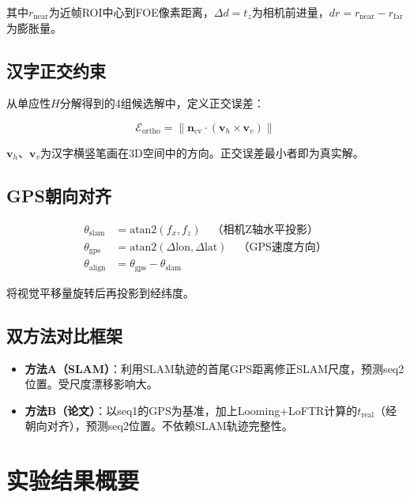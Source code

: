 \documentclass[12pt,a4paper]{ctexart}
\begin{document}
其中$r_{\text{near}}$为近帧ROI中心到FOE像素距离，$\Delta d = t_z$为相机前进量，$dr = r_{\text{near}} - r_{\text{far}}$为膨胀量。

\subsection{汉字正交约束}

从单应性$H$分解得到的4组候选解中，定义正交误差：

\begin{equation}
\mathcal{E}_{\text{ortho}} = \|\mathbf{n}_{\text{cv}} \cdot (\mathbf{v}_h \times \mathbf{v}_v)\|
\end{equation}

$\mathbf{v}_h$、$\mathbf{v}_v$为汉字横竖笔画在3D空间中的方向。正交误差最小者即为真实解。

\subsection{GPS朝向对齐}

\begin{align}
\theta_{\text{slam}} &= \text{atan2}(f_x, f_z) \quad\text{（相机Z轴水平投影）}\\
\theta_{\text{gps}} &= \text{atan2}(\Delta\text{lon}, \Delta\text{lat}) \quad\text{（GPS速度方向）}\\
\theta_{\text{align}} &= \theta_{\text{gps}} - \theta_{\text{slam}}
\end{align}

将视觉平移量旋转后再投影到经纬度。

\subsection{双方法对比框架}

\begin{itemize}
    \item \textbf{方法A（SLAM）}：利用SLAM轨迹的首尾GPS距离修正SLAM尺度，预测seq2位置。受尺度漂移影响大。
    \item \textbf{方法B（论文）}：以seq1的GPS为基准，加上Looming+LoFTR计算的$t_{\text{real}}$（经朝向对齐），预测seq2位置。不依赖SLAM轨迹完整性。
\end{itemize}

\section{实验结果概要}
\end{document}

